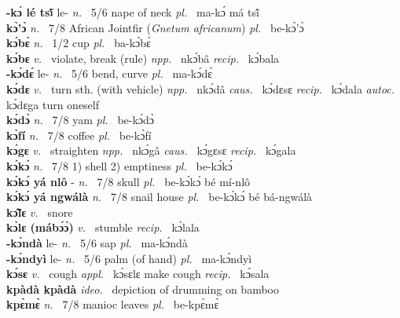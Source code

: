 {\bfseries -kɔ́ lé tsĩ́} le- {\itshape n.~} 5/6 nape of neck {\itshape pl.~} ma-kɔ́ má tsĩ́    \\ 
{\bfseries kɔ̀'ɔ̀}  {\itshape n.~} 7/8 African Jointfir ({\itshape Gnetum africanum}) {\itshape pl.~} be-kɔ̀'ɔ̀    \\ 
{\bfseries kɔ́bɛ̀}  {\itshape n.~} 1/2 cup {\itshape pl.~} ba-kɔ́bɛ̀    \\ 
{\bfseries kɔ́bɛ}  {\itshape v.~} violate, break (rule)   {\itshape npp.~} nkɔ́bâ {\itshape recip.~} kɔ́bala  \\ 
{\bfseries -kɔ́dɛ́} le- {\itshape n.~} 5/6 bend, curve {\itshape pl.~} ma-kɔ́dɛ́    \\ 
{\bfseries kɔ́dɛ}  {\itshape v.~} turn sth. (with vehicle)   {\itshape npp.~} nkɔ́dâ {\itshape caus.~} kɔ́dɛsɛ {\itshape recip.~} kɔ́dala {\itshape autoc.~} kɔ́dɛga turn oneself  \\ 
{\bfseries kɔ́dɔ̀}  {\itshape n.~} 7/8 yam {\itshape pl.~} be-kɔ́dɔ̀    \\ 
{\bfseries kɔ̀fí}  {\itshape n.~} 7/8 coffee {\itshape pl.~} be-kɔ̀fí    \\ 
{\bfseries kɔ́gɛ}  {\itshape v.~} straighten   {\itshape npp.~} nkɔ́gâ {\itshape caus.~} kɔ́gɛsɛ {\itshape recip.~} kɔ́gala  \\ 
{\bfseries kɔ́kɔ́}  {\itshape n.~} 7/8 1) shell 2) emptiness {\itshape pl.~} be-kɔ́kɔ́    \\ 
{\bfseries kɔ́kɔ́ yá nlô} - {\itshape n.~} 7/8 skull {\itshape pl.~} be-kɔ́kɔ́ bé mí-nlô    \\ 
{\bfseries kɔ́kɔ́ yá ngwálà}  {\itshape n.~} 7/8 snail house {\itshape pl.~} be-kɔ́kɔ́ bé bá-ngwálà    \\ 
{\bfseries kɔ̃̂lɛ}  {\itshape v.~} snore    \\ 
{\bfseries kɔ̀lɛ (mábɔ́ɔ̀)}  {\itshape v.~} stumble   {\itshape recip.~} kɔ̀lala  \\ 
{\bfseries -kɔ́ndà} le- {\itshape n.~} 5/6 sap {\itshape pl.~} ma-kɔ́ndà    \\ 
{\bfseries -kɔ́ndyì} le- {\itshape n.~} 5/6 palm (of hand) {\itshape pl.~} ma-kɔ́ndyì    \\ 
{\bfseries kɔ́sɛ}  {\itshape v.~} cough   {\itshape appl.~} kɔ́sɛlɛ make cough {\itshape recip.~} kɔ́sala  \\ 
{\bfseries kpàdà kpàdà}  {\itshape ideo.~} depiction of drumming on bamboo    \\ 
{\bfseries kpɛ̀mɛ̀}  {\itshape n.~} 7/8 manioc leaves {\itshape pl.~} be-kpɛ̀mɛ̀    \\ 

